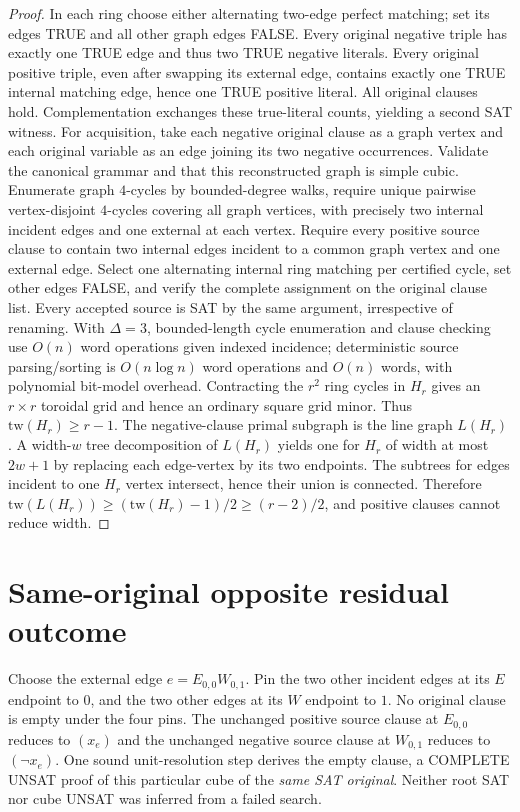 \documentclass[11pt]{article}
\begin{document}
\begin{proof}
In each ring choose either alternating two-edge perfect matching; set its edges TRUE and all other graph edges FALSE. Every original negative triple has exactly one TRUE edge and thus two TRUE negative literals. Every original positive triple, even after swapping its external edge, contains exactly one TRUE internal matching edge, hence one TRUE positive literal. All original clauses hold. Complementation exchanges these true-literal counts, yielding a second SAT witness.
For acquisition, take each negative original clause as a graph vertex and each original variable as an edge joining its two negative occurrences. Validate the canonical grammar and that this reconstructed graph is simple cubic. Enumerate graph $4$-cycles by bounded-degree walks, require unique pairwise vertex-disjoint $4$-cycles covering all graph vertices, with precisely two internal incident edges and one external at each vertex. Require every positive source clause to contain two internal edges incident to a common graph vertex and one external edge. Select one alternating internal ring matching per certified cycle, set other edges FALSE, and verify the complete assignment on the original clause list. Every accepted source is SAT by the same argument, irrespective of renaming. With $\Delta=3$, bounded-length cycle enumeration and clause checking use $O(n)$ word operations given indexed incidence; deterministic source parsing/sorting is $O(n\log n)$ word operations and $O(n)$ words, with polynomial bit-model overhead.
Contracting the $r^2$ ring cycles in $H_r$ gives an $r\times r$ toroidal grid and hence an ordinary square grid minor. Thus $\mathrm{tw}(H_r)\ge r-1$. The negative-clause primal subgraph is the line graph $L(H_r)$. A width-$w$ tree decomposition of $L(H_r)$ yields one for $H_r$ of width at most $2w+1$ by replacing each edge-vertex by its two endpoints. The subtrees for edges incident to one $H_r$ vertex intersect, hence their union is connected. Therefore $\mathrm{tw}(L(H_r))\ge(\mathrm{tw}(H_r)-1)/2\ge(r-2)/2$, and positive clauses cannot reduce width.
\end{proof}
\section*{Same-original opposite residual outcome}
Choose the external edge $e=E_{0,0}W_{0,1}$. Pin the two other incident edges at its $E$ endpoint to $0$, and the two other edges at its $W$ endpoint to $1$. No original clause is empty under the four pins. The unchanged positive source clause at $E_{0,0}$ reduces to $(x_e)$ and the unchanged negative source clause at $W_{0,1}$ reduces to $(\neg x_e)$. One sound unit-resolution step derives the empty clause, a COMPLETE UNSAT proof of this particular cube of the \emph{same SAT original}. Neither root SAT nor cube UNSAT was inferred from a failed search.
\end{document}
